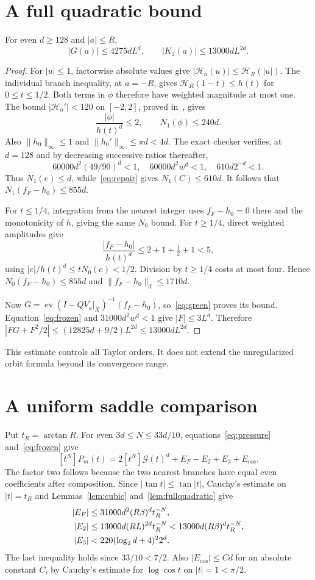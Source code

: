 \documentclass[11pt,a4paper]{article}
\theoremstyle{remark}\newtheorem*{ednote}{Editorial note (ProveIt, 2026-10-01)}
\newcommand{\ev}{\operatorname{ev}}\newcommand{\Z}{\mathbb Z}
\newcommand{\HH}{\mathcal H}\newcommand{\GG}{\mathcal G}
\begin{document}
\section{A full quadratic bound}
\begin{lemma}\label{lem:fullquadratic}
For even $d\ge128$ and $|a|\le R$,
\[
 |G(a)|\le4275dL^d,\qquad |K_2(a)|\le13000dL^{2d}.
\]
\end{lemma}
\begin{proof}
For $|u|\le1$, factorwise absolute values give
$|\HH_a(u)|\le\HH_R(|u|)$. The individual branch inequality, at $a=-R$, gives
$\HH_R(1-t)\le h(t)$ for $0\le t\le1/2$. Both terms in $\phi$ therefore have weighted magnitude at most one. The bound $|\HH_a'|<120$ on $[-2,2]$, proved in~\cite{AllOrders}, gives
\[
 \frac{|\phi|}{h(t)^d}\le2,\qquad N_1(\phi)\le240d.
\]
Also $\|h_0\|_\infty\le1$ and $\|h_0'\|_\infty\le\pi d<4d$.
The exact checker verifies, at $d=128$ and by decreasing successive ratios thereafter,
\begin{equation}\label{eq:small}
 60000d^2(49/90)^d<1,\quad60000d^2w^d<1,\quad610d2^{-d}<1.
\end{equation}
Thus $N_1(e)\le d$, while~\eqref{eq:repair} gives $N_1(C)\le610d$. It follows that $N_1(f_F-h_0)\le855d$.

For $t\le1/4$, integration from the nearest integer uses $f_F-h_0=0$ there and the monotonicity of $h$, giving the same $N_0$ bound. For $t\ge1/4$, direct weighted amplitudes give
\[
 \frac{|f_F-h_0|}{h(t)^d}\le2+1+\tfrac12+1<5,
\]
using $|e|/h(t)^d\le tN_0(e)<1/2$. Division by $t\ge1/4$ costs at most four. Hence $N_0(f_F-h_0)\le855d$ and $\|f_F-h_0\|_d\le1710d$.

Now $G=\ev(I-QV_a|_X)^{-1}(f_F-h_0)$, so~\eqref{eq:green} proves its bound. Equation~\eqref{eq:frozen} and $31000d^2w^d<1$ give $|F|\le3L^d$. Therefore
$|FG+F^2/2|\le(12825d+9/2)L^{2d}\le13000dL^{2d}$.
\end{proof}
This estimate controls all Taylor orders. It does not extend the unregularized orbit formula beyond its convergence range.

\section{A uniform saddle comparison}
Put $t_R=\arctan R$. For even $3d\le N\le33d/10$, equations~\eqref{eq:pressure} and~\eqref{eq:frozen} give
\begin{equation}\label{eq:split}
 [t^N]P_m(t)=2[t^N]\GG(t)^d+E_F-E_2+E_3+E_{\cos}.
\end{equation}
The factor two follows because the two nearest branches have equal even coefficients after composition. Since $|\tan t|\le\tan|t|$, Cauchy's estimate on $|t|=t_R$ and Lemmas~\ref{lem:cubic} and~\ref{lem:fullquadratic} give
\begin{align}
 |E_F|&\le31000d^2(R\beta)^dt_R^{-N},\notag\\
 |E_2|&\le13000d(RL)^{2d}t_R^{-N}
       <13000d(R\beta)^dt_R^{-N},\label{eq:errors}\\
 |E_3|&<220(\log_2d+4)^2 2^d.\notag
\end{align}
The last inequality holds since $33/10<7/2$. Also $|E_{\cos}|\le C d$ for an absolute constant $C$, by Cauchy's estimate for $\log\cos t$ on $|t|=1<\pi/2$.
\end{document}
